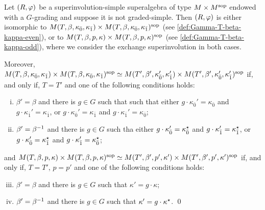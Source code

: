 \begin{thm}
    Let $(R, \varphi)$ be a superinvolution-simple superalgebra of type $M\times M^{\mathrm{sop}}$ endowed with a $G$-grading and suppose it is not graded-simple. 
    Then $(R, \varphi)$ is either isomorphic to $M(T, \beta, \kappa_{\bar{0}}, \kappa_{\bar{1}}) \times M(T, \beta, \kappa_{\bar{0}}, \kappa_{\bar{1}})^{\mathrm{sop}}$ (see \cref{def:Gamma-T-beta-kappa-even}), or to $M (T, \beta, p, \kappa) \times M (T, \beta, p, \kappa)^{\mathrm{sop}}$ (see \cref{def:Gamma-T-beta-kappa-odd}), where we consider the exchange superinvolution in both cases. 
    
    Moreover, $M(T, \beta, \kappa_{\bar{0}}, \kappa_{\bar{1}}) \times M(T, \beta, \kappa_{\bar{0}}, \kappa_{\bar{1}})^{\mathrm{sop}} \simeq M(T', \beta', \kappa_{\bar{0}}', \kappa_{\bar{1}}') \times M(T', \beta', \kappa_{\bar{0}}', \kappa_{\bar{1}}')^{\mathrm{sop}}$ if, and only if, $T = T'$ and one of the following conditions holds:
	\begin{enumerate}[(i)]
	    \item $\beta'=\beta$ and there is $g\in G$ such that such that either $g \cdot \kappa_{\bar 0}'=\kappa_{\bar 0}$ and $g \cdot \kappa_{\bar 1}'=\kappa_{\bar 1}$, or $g \cdot \kappa_{\bar 0}'=\kappa_{\bar 1}$ and $g \cdot \kappa_{\bar 1}'=\kappa_{\bar 0}$; 
	    \item $\beta'=\beta^{-1}$ and there is $g\in G$ such tha either $g \cdot \kappa_{\bar 0}'=\kappa_{\bar 0}^\star$ and $g \cdot \kappa_{\bar 1}'=\kappa_{\bar 1}^\star$, or $g \cdot \kappa_{\bar 0}'=\kappa_{\bar 1}^\star$ and $g \cdot \kappa_{\bar 1}'=\kappa_{\bar 0}^\star$;
	\end{enumerate}
    and $M (T, \beta, p, \kappa) \times M (T, \beta, p, \kappa)^{\mathrm{sop}} \simeq M (T', \beta', p', \kappa') \times M (T', \beta', p', \kappa')^{\mathrm{sop}}$ if, and only if, $T = T'$, $p=p'$ and one of the following conditions holds:
    \begin{enumerate}[(i)]
        \setcounter{enumi}{2}
	    \item $\beta'=\beta$ and there is $g\in G$ such that $\kappa' = g \cdot \kappa$;
	    \item $\beta'=\beta^{-1}$ and there is $g\in G$ such that $\kappa' = g \cdot \kappa^\star$. \qed
	\end{enumerate}
\end{thm}

